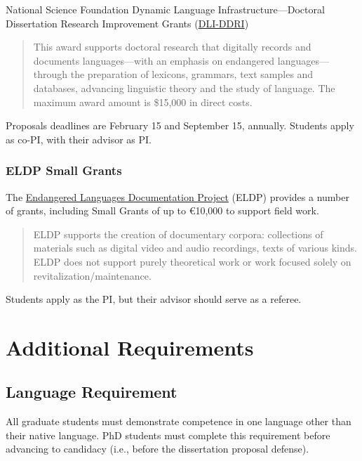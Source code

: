 \documentclass[
]{book}
\begin{document}
National Science Foundation Dynamic Language Infrastructure---Doctoral Dissertation Research Improvement Grants (\href{https://beta.nsf.gov/funding/opportunities/dynamic-language-infrastructure-doctoral}{DLI-DDRI})

\begin{quote}
This award supports doctoral research that digitally records and documents languages---with an emphasis on endangered languages---through the preparation of lexicons, grammars, text samples and databases, advancing linguistic theory and the study of language. The maximum award amount is \$15,000 in direct costs.
\end{quote}

Proposals deadlines are February 15 and September 15, annually. Students apply as co-PI, with their advisor as PI.

\hypertarget{eldp-small-grants}{%
\subsection{ELDP Small Grants}\label{eldp-small-grants}}

The \href{http://eldp.net}{Endangered Languages Documentation Project} (ELDP) provides a number of grants, including Small Grants of up to €10,000 to support field work.

\begin{quote}
ELDP supports the creation of documentary corpora: collections of materials such as digital video and audio recordings, texts of various kinds. ELDP does not support purely theoretical work or work focused solely on revitalization/maintenance.
\end{quote}

Students apply as the PI, but their advisor should serve as a referee.

\hypertarget{additional-requirements}{%
\chapter{Additional Requirements}\label{additional-requirements}}

\hypertarget{language-requirement}{%
\section{Language Requirement}\label{language-requirement}}

All graduate students must demonstrate competence in one language other than their native language. PhD students must complete this requirement before advancing to candidacy (i.e., before the dissertation proposal defense).
\end{document}

